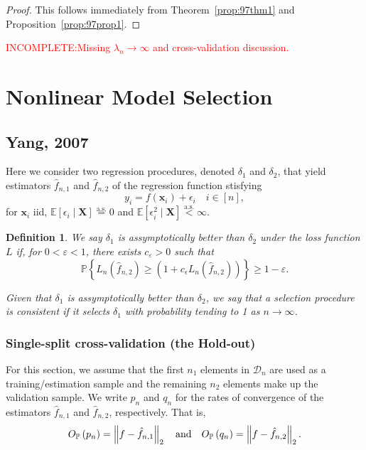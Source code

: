 \documentclass[12pt, letter paper]{article}
\newcommand{\1}{\mathmybb{1}}
\newtheorem{definition}{Definition}[section]
\newcommand{\0}{\emptyset}
\newcommand{\prob}{\mathbb{P}}
\newcommand{\Ep}[1]{\mathbb{E}\left[ #1 \right]}
\newcommand{\paren}[1]{\left(#1 \right)}
\newcommand{\set}[1]{\left\{ #1 \right\}}
\newcommand{\norm}[1]{\left|\hspace{-1pt}\left|#1 \right|\hspace{-1pt}\right|}
\newcommand{\data}{\mathcal{D}_{n}}
\newcommand{\aseq}{\stackrel{\mathrm{a.s.}}{=}}
\newcommand{\X}{\boldsymbol{X}}
\newcommand{\x}{\boldsymbol{x}}
\newcommand{\Loss}[1]{L_{n}\paren{#1}}
\newcommand{\Op}[1]{O_{\prob}\paren{#1}}
\newcommand{\fhat}[2]{\hat{f}_{#1, #2}}
\begin{document}
\begin{proof}
    This follows immediately from Theorem~\ref{prop:97thm1} and Proposition~\ref{prop:97prop1}.
\end{proof}

\textcolor{red}{INCOMPLETE:\@ Missing \(\lambda_{n}\to\infty\) and cross-validation discussion.}

\section{Nonlinear Model Selection}

\subsection{Yang, 2007}

Here we consider two regression procedures, denoted \(\delta_{1}\) and \(\delta_{2}\), that yield estimators \(\hat{f}_{n, 1}\) and \(\hat{f}_{n, 2}\) of the regression function stisfying
\[y_{i} = f(\x_{i}) + \epsilon_{i}\quad i\in[n],\]
for \(\x_{i}\) iid, \(\Ep{\epsilon_{i}\mid \X} \aseq 0\) and \(\Ep{\epsilon_{i}^{2}\mid \X} \stackrel{\text{a.s.}}{<} \infty\).

\begin{definition}
    We say \(\delta_{1}\) is \emph{assymptotically better} than \(\delta_{2}\) under the loss function \(L\) if, for \(0<\varepsilon<1\), there exists \(c_{\varepsilon}>0\) such that
    \[\prob\set{\Loss{\fhat{n}{2}}\geq (1+c_{\epsilon}\Loss{\fhat{n}{2}}) }\geq 1-\varepsilon.\]

    Given that \(\delta_{1}\) is assymptotically better than \(\delta_{2}\), we say that a selection procedure is consistent if it selects \(\delta_{1}\) with probability tending to 1 as \(n\to\infty\).
\end{definition}


\subsubsection{Single-split cross-validation (the Hold-out)}

For this section, we assume that the first \(n_1\) elements in \(\data\) are used as a training/estimation sample and the remaining \(n_2\) elements make up the validation sample. We write \(p_{n}\) and \(q_{n}\) for the rates of convergence of the estimators \(\fhat{n}{1}\) and \(\fhat{n}{2}\), respectively. That is,
\[\Op{p_{n}} = \norm{f - \fhat{n}{1}}_{2}\quad\text{and}\quad \Op{q_{n}} = \norm{f- \fhat{n}{2}}_{2}.\]
\end{document}
